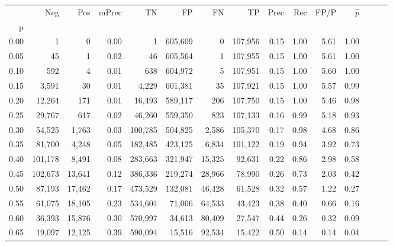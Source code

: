 \begin{tabular}{rrrrrrrrrrrrrrr}
\toprule
{} &      Neg &     Pos & mPrec &       TN &       FP &       FN &       TP &  Prec &   Rec &  FP/P & $\hat{p}$ \\
p    &          &         &       &          &          &          &          &       &       &       &           \\
\midrule
0.00 &        1 &       0 &  0.00 &        1 &  605,609 &        0 &  107,956 &  0.15 &  1.00 &  5.61 &      1.00 \\
0.05 &       45 &       1 &  0.02 &       46 &  605,564 &        1 &  107,955 &  0.15 &  1.00 &  5.61 &      1.00 \\
0.10 &      592 &       4 &  0.01 &      638 &  604,972 &        5 &  107,951 &  0.15 &  1.00 &  5.60 &      1.00 \\
0.15 &    3,591 &      30 &  0.01 &    4,229 &  601,381 &       35 &  107,921 &  0.15 &  1.00 &  5.57 &      0.99 \\
0.20 &   12,264 &     171 &  0.01 &   16,493 &  589,117 &      206 &  107,750 &  0.15 &  1.00 &  5.46 &      0.98 \\
0.25 &   29,767 &     617 &  0.02 &   46,260 &  559,350 &      823 &  107,133 &  0.16 &  0.99 &  5.18 &      0.93 \\
0.30 &   54,525 &   1,763 &  0.03 &  100,785 &  504,825 &    2,586 &  105,370 &  0.17 &  0.98 &  4.68 &      0.86 \\
0.35 &   81,700 &   4,248 &  0.05 &  182,485 &  423,125 &    6,834 &  101,122 &  0.19 &  0.94 &  3.92 &      0.73 \\
0.40 &  101,178 &   8,491 &  0.08 &  283,663 &  321,947 &   15,325 &   92,631 &  0.22 &  0.86 &  2.98 &      0.58 \\
0.45 &  102,673 &  13,641 &  0.12 &  386,336 &  219,274 &   28,966 &   78,990 &  0.26 &  0.73 &  2.03 &      0.42 \\
0.50 &   87,193 &  17,462 &  0.17 &  473,529 &  132,081 &   46,428 &   61,528 &  0.32 &  0.57 &  1.22 &      0.27 \\
0.55 &   61,075 &  18,105 &  0.23 &  534,604 &   71,006 &   64,533 &   43,423 &  0.38 &  0.40 &  0.66 &      0.16 \\
0.60 &   36,393 &  15,876 &  0.30 &  570,997 &   34,613 &   80,409 &   27,547 &  0.44 &  0.26 &  0.32 &      0.09 \\
0.65 &   19,097 &  12,125 &  0.39 &  590,094 &   15,516 &   92,534 &   15,422 &  0.50 &  0.14 &  0.14 &      0.04 \\

\end{tabular}
